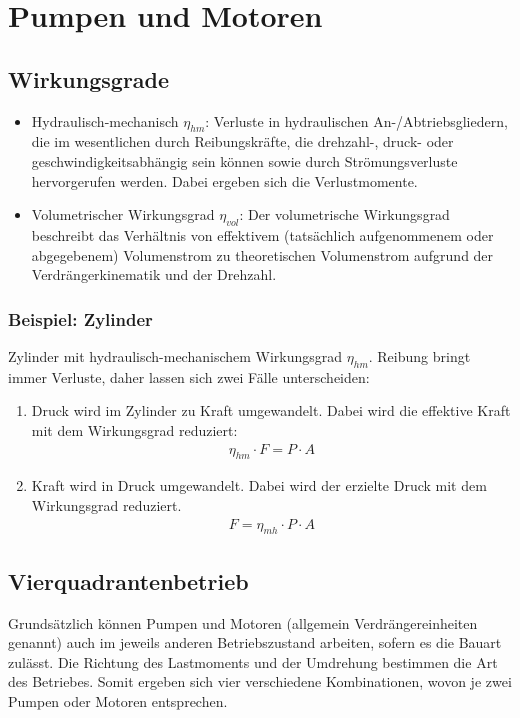 \section{Pumpen und Motoren}
\subsection{Wirkungsgrade}
\begin{itemize}
\item Hydraulisch-mechanisch $\eta_{hm}$: Verluste in hydraulischen An-/Abtriebsgliedern, die im wesentlichen durch Reibungskräfte, die drehzahl-, druck- oder geschwindigkeitsabhängig sein können sowie durch Strömungsverluste hervorgerufen werden. Dabei ergeben sich die Verlustmomente.
\item Volumetrischer Wirkungsgrad $\eta_{vol}$: Der volumetrische Wirkungsgrad beschreibt das Verhältnis von effektivem (tatsächlich aufgenommenem oder abgegebenem) Volumenstrom zu theoretischen Volumenstrom aufgrund der Verdrängerkinematik und der Drehzahl.
\end{itemize}

\subsubsection{Beispiel: Zylinder}
Zylinder mit hydraulisch-mechanischem Wirkungsgrad $\eta_{hm}$. Reibung bringt immer Verluste, daher lassen sich zwei Fälle unterscheiden:
\begin{enumerate}
\item Druck wird im  Zylinder zu Kraft umgewandelt. Dabei wird die effektive Kraft  mit dem Wirkungsgrad reduziert:
\begin{align*}
\eta_{hm} \cdot F = P \cdot A  
\end{align*}
\item Kraft wird in Druck umgewandelt. Dabei wird der erzielte Druck mit dem Wirkungsgrad reduziert.
\begin{align*}
F = \eta_{mh} \cdot P \cdot A
\end{align*}
\end{enumerate}

\subsection{Vierquadrantenbetrieb}
Grundsätzlich können Pumpen und Motoren (allgemein Verdrängereinheiten genannt) auch im jeweils anderen Betriebszustand arbeiten, sofern es die Bauart zulässt.
Die Richtung des Lastmoments und der Umdrehung bestimmen die Art des Betriebes. Somit ergeben sich vier verschiedene Kombinationen, wovon je zwei Pumpen oder Motoren entsprechen.





